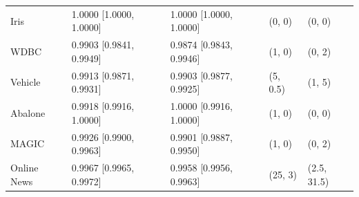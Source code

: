 \begin{tabular}{lllll}
Iris & 1.0000 [1.0000, 1.0000] & 1.0000 [1.0000, 1.0000] & (0, 0) & (0, 0) \\
WDBC & 0.9903 [0.9841, 0.9949] & 0.9874 [0.9843, 0.9946] & (1, 0) & (0, 2) \\
Vehicle & 0.9913 [0.9871, 0.9931] & 0.9903 [0.9877, 0.9925] & (5, 0.5) & (1, 5) \\
Abalone & 0.9918 [0.9916, 1.0000] & 1.0000 [0.9916, 1.0000] & (1, 0) & (0, 0) \\
MAGIC & 0.9926 [0.9900, 0.9963] & 0.9901 [0.9887, 0.9950] & (1, 0) & (0, 2) \\
Online News & 0.9967 [0.9965, 0.9972] & 0.9958 [0.9956, 0.9963] & (25, 3) & (2.5, 31.5) \\
\end{tabular}
